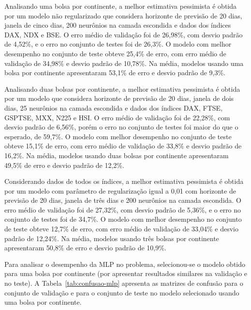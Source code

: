 \documentclass[12pt,a4paper,utf8]{ppgsi}
\begin{document}
        Analisando uma bolsa por continente, a melhor estimativa pessimista é obtida por um modelo não regularizado que considera horizonte de previsão de 20 dias, janela de cinco dias, 200 neurônios na camada escondida e dados dos índices DAX, NDX e BSE. O erro médio de validação foi de 26,98\%, com desvio padrão de 4,52\%, e o erro no conjunto de testes foi de 26,3\%. O modelo com melhor desempenho no conjunto de teste obteve 25,4\% de erro, com erro médio de validação de 34,98\% e desvio padrão de 10,78\%. Na média, modelos usando uma bolsa por continente apresentaram 53,1\% de erro e desvio padrão de 9,3\%.

            Analisando duas bolsas por continente, a melhor estimativa pessimista é obtida por um modelo que considera horizonte de previsão de 20 dias, janela de dois dias, 25 neurônios na camada escondida e dados dos índices DAX, FTSE, GSPTSE, MXX, N225 e HSI. O erro médio de validação foi de 22,28\%, com desvio padrão de 6,56\%, porém o erro no conjunto de testes foi maior do que o esperado, de 59,7\%. O modelo com melhor desempenho no conjunto de teste obteve 15,1\% de erro, com erro médio de validação de 33,8\% e desvio padrão de 16,2\%. Na média, modelos usando duas bolsas por continente apresentaram 49,5\% de erro e desvio padrão de 12,2\%.

            Considerando dados de todos os índices, a melhor estimativa pessimista é obtida por um modelo com parâmetro de regularização igual a 0,01 com horizonte de previsão de 20 dias, janela de três dias e 200 neurônios na camada escondida. O erro médio de validação foi de 27,32\%, com desvio padrão de 5,36\%, e o erro no conjunto de testes foi de 34,7\%. O modelo com melhor desempenho no conjunto de teste obteve 12,7\% de erro, com erro médio de validação de 33,04\% e desvio padrão de 12,24\%. Na média, modelos usando três bolsas por continente apresentaram 50,8\% de erro e desvio padrão de 10,9\%.
						
						Para analisar o desempenho da MLP no problema, selecionou-se o modelo obtido para uma bolsa por continente (por apresentar resultados similares na validação e no teste). A Tabela~\ref{tab:confusao-mlp} apresenta as matrizes de confusão para o conjunto de validação e para o conjunto de teste no modelo selecionado usando uma bolsa por continente. 
\end{document}

